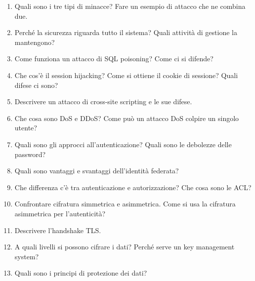 \begin{domande}
\begin{enumerate}
  \item Quali sono i tre tipi di minacce? Fare un esempio di attacco che ne combina due.
  \item Perché la sicurezza riguarda tutto il sistema? Quali attività di gestione la mantengono?
  \item Come funziona un attacco di SQL poisoning? Come ci si difende?
  \item Che cos'è il session hijacking? Come si ottiene il cookie di sessione? Quali difese ci sono?
  \item Descrivere un attacco di cross-site scripting e le sue difese.
  \item Che cosa sono DoS e DDoS? Come può un attacco DoS colpire un singolo utente?
  \item Quali sono gli approcci all'autenticazione? Quali sono le debolezze delle password?
  \item Quali sono vantaggi e svantaggi dell'identità federata?
  \item Che differenza c'è tra autenticazione e autorizzazione? Che cosa sono le ACL?
  \item Confrontare cifratura simmetrica e asimmetrica. Come si usa la cifratura asimmetrica per l'autenticità?
  \item Descrivere l'handshake TLS.
  \item A quali livelli si possono cifrare i dati? Perché serve un key management system?
  \item Quali sono i principi di protezione dei dati?
\end{enumerate}
\end{domande}
